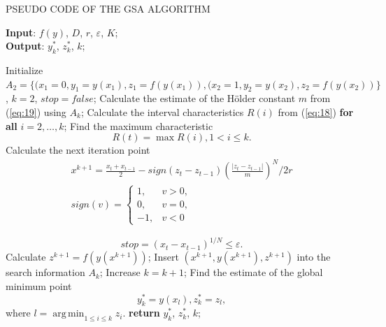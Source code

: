 \documentclass[review]{elsarticle}
\DeclareMathOperator*{\argmin}{arg\,min}
\begin{document}
\begin{algorithm}[]
\caption{PSEUDO CODE OF THE GSA ALGORITHM} \label{alg:1}
\scriptsize
\hspace*{\algorithmicindent} \textbf{Input}: $f(y)$, $D$, $r$, $\varepsilon$, $K$;\\
\hspace*{\algorithmicindent} \textbf{Output}: $y_k^*$, $z_k^*$, $k$;
\begin{algorithmic}[1]
\State Initialize $A_2=\{(x_1=0,y_1=y(x_1 ),z_1=f(y(x_1 )),(x_2=1,y_2=y(x_2 ),z_2=f(y(x_2 ))\}$, $k = 2$, $stop = false$;
  \State Calculate the estimate of the H\"older constant $m$ from (\ref{eq:19}) using $A_k$;
  \State Calculate the interval characteristics $R(i)$ from (\ref{eq:18}) \textbf{for all} $i = 2, \dots, k$;
	\State Find the maximum characteristic 
	\begin{equation}\label{eq:20}
		R(t)=\max{R(i)}, 1 < i \leq k.
  \end{equation}
	\State Calculate the next iteration point
	\begin{equation}\label{eq:21}
	\begin{matrix}
	   x^{k+1}=\frac{x_t+x_{t-1}}{2}-sign(z_t-z_{t-1})(\frac{|z_t-z_{t-1}|}{m})^N/2r \\
		 sign(v)=\begin{cases}
		            1, &v>0,\\
		            0, &v=0,\\
								-1,&v<0
							\end{cases}
	\end{matrix}
	\end{equation}
	
	\State
	\begin{equation}\label{eq:22}
     stop = (x_t - x_{t-1})^{1/N} \leq \varepsilon.
  \end{equation}
	  \State Calculate $z^{k+1} = f( y(x^{k+1}))$;
    \State Insert $(x^{k+1}, y(x^{k+1}), z^{k+1})$ into the search information $A_k$;
    \State Increase $k = k + 1$;
  \EndIf
\EndWhile
\State Find the estimate of the global minimum point
\begin{equation}\label{eq:23}
y_k^*= y(x_l),  z_k^*=z_l,
\end{equation}
where $l= \argmin_{1 \leq i \leq k}z_i$.
\State \textbf{return} $y_k^*$, $z_k^*$, $k$;
\end{algorithmic}
\end{algorithm}
\end{document}

